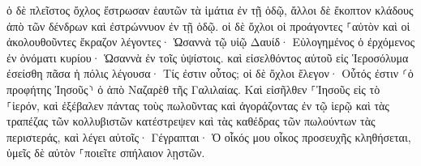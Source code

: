 \documentclass{openreader}
\begin{document}
ὁ δὲ πλεῖστος ὄχλος ἔστρωσαν ἑαυτῶν τὰ ἱμάτια ἐν τῇ ὁδῷ, ἄλλοι δὲ ἔκοπτον κλάδους ἀπὸ τῶν δένδρων καὶ ἐστρώννυον ἐν τῇ ὁδῷ. 
οἱ δὲ ὄχλοι οἱ προάγοντες ⸀αὐτὸν καὶ οἱ ἀκολουθοῦντες ἔκραζον λέγοντες· Ὡσαννὰ τῷ υἱῷ Δαυίδ· Εὐλογημένος ὁ ἐρχόμενος ἐν ὀνόματι κυρίου· Ὡσαννὰ ἐν τοῖς ὑψίστοις. 
καὶ εἰσελθόντος αὐτοῦ εἰς Ἱεροσόλυμα ἐσείσθη πᾶσα ἡ πόλις λέγουσα· Τίς ἐστιν οὗτος; 
οἱ δὲ ὄχλοι ἔλεγον· Οὗτός ἐστιν ⸂ὁ προφήτης Ἰησοῦς⸃ ὁ ἀπὸ Ναζαρὲθ τῆς Γαλιλαίας. 
Καὶ εἰσῆλθεν ⸀Ἰησοῦς εἰς τὸ ⸀ἱερόν, καὶ ἐξέβαλεν πάντας τοὺς πωλοῦντας καὶ ἀγοράζοντας ἐν τῷ ἱερῷ καὶ τὰς τραπέζας τῶν κολλυβιστῶν κατέστρεψεν καὶ τὰς καθέδρας τῶν πωλούντων τὰς περιστεράς, 
καὶ λέγει αὐτοῖς· Γέγραπται· Ὁ οἶκός μου οἶκος προσευχῆς κληθήσεται, ὑμεῖς δὲ αὐτὸν ⸀ποιεῖτε σπήλαιον λῃστῶν. 
\end{document}
